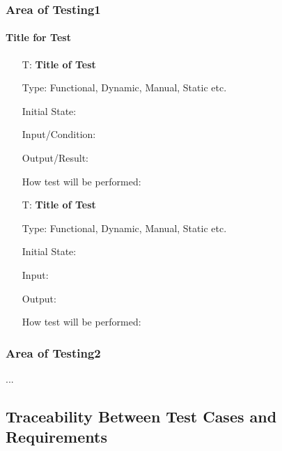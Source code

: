 \documentclass[12pt, titlepage]{article}
\newcounter{testnum} %
\begin{document}


\subsubsection{Area of Testing1}

\paragraph{Title for Test}

\begin{enumerate}

  \item[T\refstepcounter{testnum}\thetestnum \label{test_label}:]
    \textbf{Title of Test}

    Type: Functional, Dynamic, Manual, Static etc.

    Initial State:

    Input/Condition:

    Output/Result:

    How test will be performed:

  \item[T\refstepcounter{testnum}\thetestnum \label{test_label2}:]
    \textbf{Title of Test}

    Type: Functional, Dynamic, Manual, Static etc.

    Initial State:

    Input:

    Output:

    How test will be performed:

\end{enumerate}

\subsubsection{Area of Testing2}

...

\subsection{Traceability Between Test Cases and Requirements}

\end{document}
